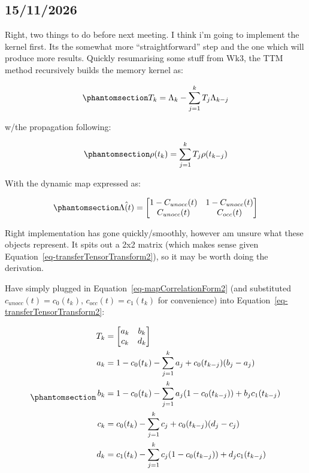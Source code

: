 \documentclass[
  letterpaper,
  DIV=11,
  numbers=noendperiod]{scrartcl}
\begin{document}
\subsection{15/11/2026}\label{section-2}

Right, two things to do before next meeting. I think i'm going to
implement the kernel first. Its the somewhat more ``straightforward''
step and the one which will produce more results. Quickly resumarising
some stuff from Wk3, the TTM method recursively builds the memory kernel
as:

\begin{equation}\phantomsection\label{eq-transferTensorTransform2}{
T_{k} = \Lambda_{k}-\sum_{j=1}^{k}T_{j}\Lambda_{k-j}
}\end{equation}

w/the propagation following:

\begin{equation}\phantomsection\label{eq-tensorPropagation}{
\rho(t_{k}) = \sum_{j=1}^{k}T_{j}\rho(t_{k-j})
}\end{equation}

With the dynamic map expressed as:

\begin{equation}\phantomsection\label{eq-mapCorrelationForm2}{
\hat{\Lambda(t)} = \begin{bmatrix}
1-C_{unocc}(t) & 1-C_{unocc}(t) \\
C_{unocc}(t) & C_{occ}(t)
\end{bmatrix}
}\end{equation}

Right implementation has gone quickly/smoothly, however am unsure what
these objects represent. It spits out a 2x2 matrix (which makes sense
given Equation~\ref{eq-transferTensorTransform2}), so it may be worth
doing the derivation.

Have simply plugged in Equation~\ref{eq-mapCorrelationForm2} (and
substituted \(c_{unocc}(t)=c_{0}(t_{k})\), \(c_{occ}(t)=c_{1}(t_{k})\)
for convenience) into Equation~\ref{eq-transferTensorTransform2}:

\begin{equation}\phantomsection\label{eq-tensorMapRelation}{
\begin{align}
T_{k} &= \begin{bmatrix} a_{k} & b_{k} \\ c_{k} & d_{k} \end{bmatrix} \\
a_{k}&=1-c_{0}(t_{k})-\sum_{j=1}^{k}a_{j}+c_{0}(t_{k-j})(b_{j}-a_{j}) \\
b_{k}&=1-c_{0}(t_{k})-\sum_{j=1}^{k}a_{j}(1-c_{0}(t_{k-j}))+b_{j}c_{1}(t_{k-j}) \\
c_{k}&=c_{0}(t_{k})-\sum_{j=1}^{k}c_{j}+c_{0}(t_{k-j})(d_{j}-c_{j}) \\
d_{k}&=c_{1}(t_{k})-\sum_{j=1}^{k}c_{j}(1-c_{0}(t_{k-j}))+d_{j}c_{1}(t_{k-j}) \\
\end{align}
}\end{equation}
\end{document}
